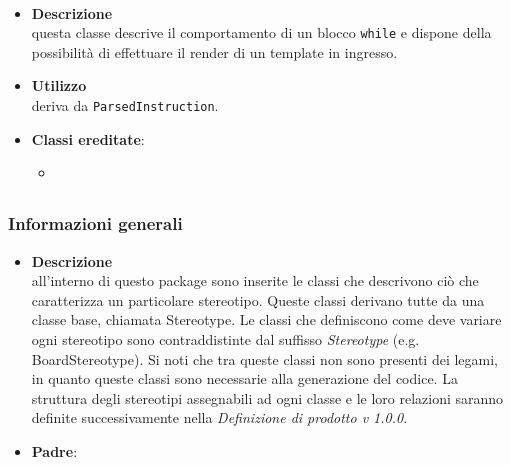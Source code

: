 \paragraph{}
\label{\nogloxy{SWEDesigner::Server::Project::ParsedWhile}}
\begin{itemize}
\item \textbf{Descrizione}\\
questa classe descrive il comportamento di un blocco \texttt{while} e dispone della possibilità di effettuare il render di un template in ingresso.
\item \textbf{Utilizzo}\\
deriva da \texttt{ParsedInstruction}.
\item \textbf{Classi ereditate}:
\begin{itemize}
\item \hyperref[\nogloxy{SWEDesigner::Server::Project::ParsedInstruction}]{}
\end{itemize}
\end{itemize}
\subsection{}
\label{\nogloxy{SWEDesigner::Server::Stereotype}}
\subsubsection{Informazioni generali}
\begin{itemize}
\item \textbf{Descrizione}\\
all'interno di questo package sono inserite le classi che descrivono ciò che caratterizza un particolare stereotipo. Queste classi derivano tutte da una classe base, chiamata Stereotype. Le classi che definiscono come deve variare ogni stereotipo sono contraddistinte dal suffisso \emph{Stereotype} (e.g. BoardStereotype). Si noti che tra queste classi non sono presenti dei legami, in quanto queste classi sono necessarie alla generazione del codice. La struttura degli stereotipi assegnabili ad ogni classe e le loro relazioni saranno definite successivamente nella \emph{Definizione di prodotto v 1.0.0}.
\item \textbf{Padre}: \hyperref[\nogloxy{SWEDesigner::Server}]{}
\end{itemize}

\subsection{}
\label{\nogloxy{SWEDesigner::Server::Template}}
